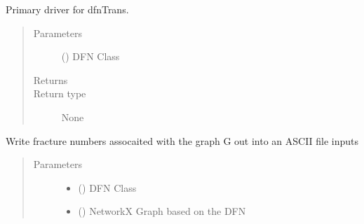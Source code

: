 \documentclass[letterpaper,10pt,english]{sphinxmanual}
\begin{document}
\begin{fulllineitems}
\begin{fulllineitems}
\end{fulllineitems}


\begin{fulllineitems}
\label{\detokenize{pydfnworks:pydfnworks.general.dfnworks.DFNWORKS.dfn_trans}}
Primary driver for dfnTrans.
\begin{quote}\begin{description}
\item[{Parameters}] \leavevmode
{} () \textendash{} DFN Class

\item[{Returns}] \leavevmode


\item[{Return type}] \leavevmode
None

\end{description}\end{quote}

\end{fulllineitems}


\begin{fulllineitems}
\label{\detokenize{pydfnworks:pydfnworks.general.dfnworks.DFNWORKS.dump_fractures}}
Write fracture numbers assocaited with the graph G out into an ASCII file inputs
\begin{quote}\begin{description}
\item[{Parameters}] \leavevmode\begin{itemize}
\item {} 
 () \textendash{} DFN Class

\item {} 
 () \textendash{} NetworkX Graph based on the DFN


\end{itemize}
\end{description}
\end{quote}
\end{fulllineitems}
\end{fulllineitems}
\end{document}
